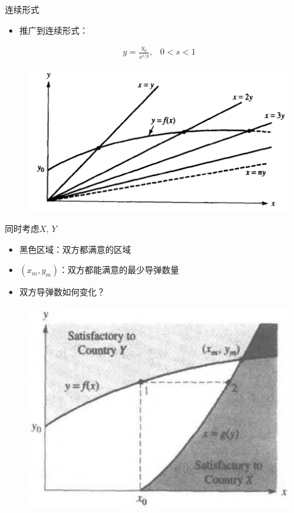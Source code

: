 \documentclass[mathserif, table]{beamer}
\begin{document}
\begin{frame}{连续形式}
  \begin{itemize}
  \item 推广到连续形式：
  \end{itemize}
  \[
  \begin{array}{ll}
    y = \frac{y_0}{s^{x/y}}, & 0 < s < 1
  \end{array}
  \]
  
  \begin{figure}
    \centering
    \includegraphics[width=.6\textwidth]{continue.png}
  \end{figure}
\end{frame}

\begin{frame}{同时考虑$X$, $Y$}
  \begin{itemize}
  \item 黑色区域：双方都满意的区域
  \item $(x_m, y_m)$：双方都能满意的最少导弹数量
  \item 双方导弹数如何变化？
  \end{itemize}
  
  \begin{figure}
    \centering
    \includegraphics[width=.5\textwidth]{two.png}
  \end{figure}

\end{frame}
\end{document}

